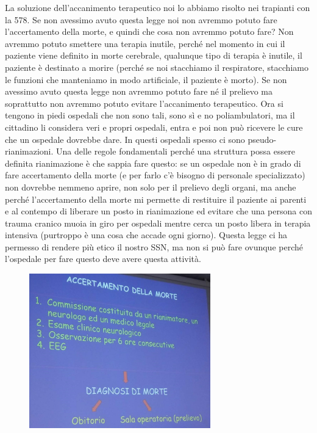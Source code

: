 La soluzione dell'accanimento terapeutico noi lo abbiamo risolto nei
trapianti con la 578. Se non avessimo avuto questa legge noi non avremmo
potuto fare l'accertamento della morte, e quindi che cosa non avremmo
potuto fare? Non avremmo potuto smettere una terapia inutile, perché nel
momento in cui il paziente viene definito in morte cerebrale, qualunque
tipo di terapia è inutile, il paziente è destinato a morire (perché se
noi stacchiamo il respiratore, stacchiamo le funzioni che manteniamo in
modo artificiale, il paziente è morto). Se non avessimo avuto questa
legge non avremmo potuto fare né il prelievo ma soprattutto non avremmo
potuto evitare l'accanimento terapeutico. Ora si tengono in piedi
ospedali che non sono tali, sono sì e no poliambulatori, ma il cittadino
li considera veri e propri ospedali, entra e poi non può ricevere le
cure che un ospedale dovrebbe dare. In questi ospedali spesso ci sono
pseudo-rianimazioni. Una delle regole fondamentali perché una struttura
possa essere definita rianimazione è che sappia fare questo: se un
ospedale non è in grado di fare accertamento della morte (e per farlo
c'è bisogno di personale specializzato) non dovrebbe nemmeno aprire, non
solo per il prelievo degli organi, ma anche perché l'accertamento della
morte mi permette di restituire il paziente ai parenti e al contempo di
liberare un posto in rianimazione ed evitare che una persona con trauma
cranico muoia in giro per ospedali mentre cerca un posto libera in
terapia intensiva (purtroppo è una cosa che accade ogni giorno). Questa
legge ci ha permesso di rendere più etico il nostro SSN, ma non si può
fare ovunque perché l'ospedale per fare questo deve avere questa
attività.
\begin{figure}[!ht]
\centering
	\includegraphics[width=0.7\textwidth]{34/image11.jpeg}
	\end{figure}

